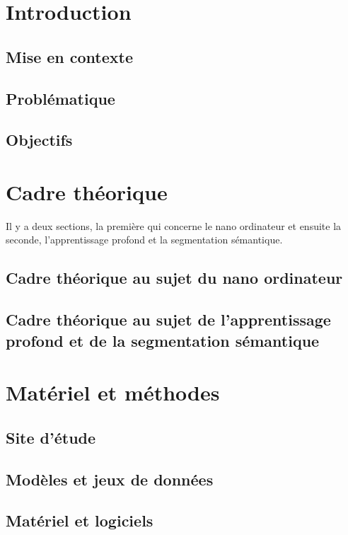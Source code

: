 \documentclass[12pt, letterpaper]{article}
\begin{document}
\section{Introduction}
\subsection{Mise en contexte}

\subsection{Problématique}

\subsection{Objectifs}

\section{Cadre théorique}
Il y a deux sections, la première qui concerne le nano ordinateur et ensuite la seconde, l'apprentissage profond et la segmentation sémantique.
\subsection{Cadre théorique au sujet du nano ordinateur}

\subsection{Cadre théorique au sujet de l'apprentissage profond et de la segmentation sémantique}

\section{Matériel et méthodes}
\subsection{Site d'étude}

\subsection{Modèles et jeux de données}

\subsection{Matériel et logiciels}

\end{document}
